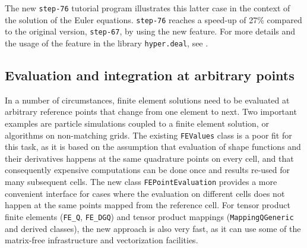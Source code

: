\documentclass{ansarticle-preprint}
\begin{document}
The new \texttt{step-76} tutorial program illustrates this latter case
in the context of the solution of the Euler equations. \texttt{step-76} reaches a
speed-up of 27\% compared to the
original version, \texttt{step-67}, by using the new feature.
For more details and the usage of the feature in the library \texttt{hyper.deal}, see \citep{munch2020hyperdeal}.



\subsection{Evaluation and integration at arbitrary points}
\label{subsec:fepointvalues}

In a number of circumstances, finite element solutions need to be evaluated at
arbitrary reference points that change from one element to next. Two important
examples are particle simulations coupled to a finite element solution, or
algorithms on non-matching grids. The existing \texttt{FEValues} class is a poor
fit for this task, as it is based on the assumption that evaluation of
shape functions and their derivatives happens at the same quadrature
points on every cell, and that consequently expensive computations can
be done once and results re-used for many subsequent cells. The new class
\texttt{FEPointEvaluation} provides a more convenient interface for
cases where the evaluation on different cells does not happen at the
same points mapped from the reference cell.
For tensor product finite elements (\texttt{FE\_Q}, \texttt{FE\_DGQ})
and tensor product mappings (\texttt{MappingQGeneric} and derived classes),
the new approach is also very fast, as it can use some of the matrix-free
infrastructure and vectorization facilities.
\end{document}
